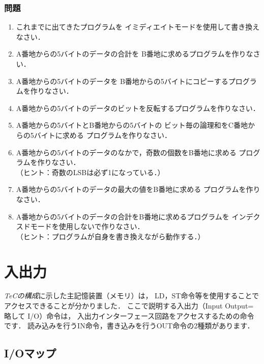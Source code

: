 \begin{center}
\end{center}

\subsubsection{問題}
\begin{enumerate}
\item これまでに出てきたプログラムを
  イミディエイトモードを使用して書き換えなさい．
\item A番地からの5バイトのデータの合計を
  B番地に求めるプログラムを作りなさい．
\item A番地からの5バイトのデータを
  B番地からの5バイトにコピーするプログラムを作りなさい．
\item A番地からの5バイトのデータのビットを反転するプログラムを作りなさい．
\item A番地からの5バイトとB番地からの5バイトの
  ビット毎の論理和をC番地からの5バイトに求める
  プログラムを作りなさい．
\item A番地からの5バイトのデータのなかで，奇数の個数をB番地に求める
  プログラムを作りなさい．\\
  （ヒント：奇数のLSBは必ず1になっている．）
\item A番地からの5バイトのデータの最大の値をB番地に求める
  プログラムを作りなさい．
\item A番地からの5バイトのデータの合計をB番地に求めるプログラムを
  インデクスドモードを使用しないで作りなさい．\\
  （ヒント：プログラムが自身を書き換えながら動作する．）
\end{enumerate}

\newpage
\section{入出力}
\emph{ TeCの構成}に示した主記憶装置（メモリ）は，
LD，ST命令等を使用することでアクセスできることが分かりました．
ここで説明する入出力（Input Output=略して I/O）命令は，
入出力インターフェース回路をアクセスするための命令です．
読み込みを行うIN命令，書き込みを行うOUT命令の2種類があります．

\subsection{I/Oマップ}
\label{iomap}


